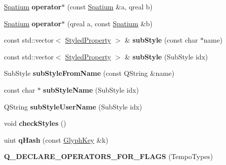 \begin{DoxyCompactItemize}
\item 
\mbox{\label{namespace_ms_a02fe0a0e87b13db24131d94d1aa38a66}} 
\hyperlink{class_ms_1_1_spatium}{Spatium} {\bfseries operator$\ast$} (const \hyperlink{class_ms_1_1_spatium}{Spatium} \&a, qreal b)
\item 
\mbox{\label{namespace_ms_abe8a3d66d4f9a4d28b4690aecec053c6}} 
\hyperlink{class_ms_1_1_spatium}{Spatium} {\bfseries operator$\ast$} (qreal a, const \hyperlink{class_ms_1_1_spatium}{Spatium} \&b)
\item 
\mbox{\label{namespace_ms_a6309f1f0850ce8e9ed939af185aea73e}} 
const std\+::vector$<$ \hyperlink{struct_ms_1_1_styled_property}{Styled\+Property} $>$ \& {\bfseries sub\+Style} (const char $\ast$name)
\item 
\mbox{\label{namespace_ms_a7cc321aaab73ccf0f2663a53a03ace06}} 
const std\+::vector$<$ \hyperlink{struct_ms_1_1_styled_property}{Styled\+Property} $>$ \& {\bfseries sub\+Style} (Sub\+Style idx)
\item 
\mbox{\label{namespace_ms_ac04418e1635e1c6c72ca9496f14d0a11}} 
Sub\+Style {\bfseries sub\+Style\+From\+Name} (const Q\+String \&name)
\item 
\mbox{\label{namespace_ms_ad897e475c53aef984b445cb4ab6180a0}} 
const char $\ast$ {\bfseries sub\+Style\+Name} (Sub\+Style idx)
\item 
\mbox{\label{namespace_ms_abb3d98819d96ac01fe200d84da4fe7ab}} 
Q\+String {\bfseries sub\+Style\+User\+Name} (Sub\+Style idx)
\item 
\mbox{\label{namespace_ms_a55d8e919fa96ded32d24cef2c39c4e12}} 
void {\bfseries check\+Styles} ()
\item 
\mbox{\label{namespace_ms_ae3ee62d8f77f2660534494a06eb62a40}} 
uint {\bfseries q\+Hash} (const \hyperlink{struct_ms_1_1_glyph_key}{Glyph\+Key} \&k)
\item 
\mbox{\label{namespace_ms_a25f351637377521f29803dcacbb73186}} 
{\bfseries Q\+\_\+\+D\+E\+C\+L\+A\+R\+E\+\_\+\+O\+P\+E\+R\+A\+T\+O\+R\+S\+\_\+\+F\+O\+R\+\_\+\+F\+L\+A\+GS} (Tempo\+Types)

\end{DoxyCompactItemize}
